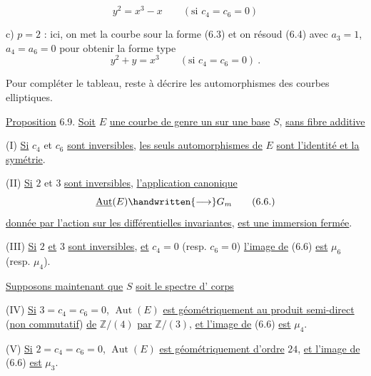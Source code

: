 
\[
y^2=x^3-x\qquad(\text{si }c_4=c_6=0)\tag*{(6.7)}
\]

c) $p=2$ : ici, on met la courbe sour la forme (6.3) et on résoud (6.4) avec $a_3=1$, $a_4=a_6=0$ pour obtenir la forme type
\[
y^2+y=x^3\qquad(\text{si }c_4=c_6=0)\ .\tag*{(6.8)}
\]

Pour compléter le tableau, reste à décrire les automorphismes des courbes elliptiques.

\uline{Proposition} 6.9. \uline{Soit} $E$ \uline{une courbe de genre un sur une base} $S$, \uline{sans fibre additive}

(I) \uline{Si} $c_4$ et $c_6$ \uline{sont inversibles,} \uline{les seuls automorphismes de} $E$ \uline{sont l'identité et la symétrie}.

(II) \uline{Si} $2$ et $3$ \uline{sont inversibles}, \uline{l'application canonique}
\[
\underline{\operatorname{Aut}}(E)\handwritten{\longrightarrow}G_m\tag*{(6.6.)}
\]
\uline{donnée par l'action sur les différentielles invariantes}, \uline{est une immersion fermée}.

(III) \uline{Si} $2$ \uline{et} $3$ \uline{sont inversibles}, \uline{et} $c_4=0$ (resp. $c_6=0$) \uline{l'image de} (6.6) \uline{est} $\mu_6$ (resp. $\mu_4$).

\uline{Supposons maintenant que} $S$ \uline{soit le spectre d' corps}

(IV) \uline{Si} $3=c_4=c_6=0$, $\operatorname{Aut}(E)$ \uline{est géométriquement  au produit semi-direct} (\uline{non commutatif}) \uline{de} $\mathbb{Z}/(4)$ \uline{par} $\mathbb{Z}/(3)$, \uline{et l'image de} (6.6) \uline{est} $\mu_4$.

(V) \uline{Si} $2=c_4=c_6=0$, $\operatorname{Aut}(E)$ \uline{est géométriquement d'ordre} $24$, \uline{et l'image de} (6.6) \uline{est} $\mu_3$.

